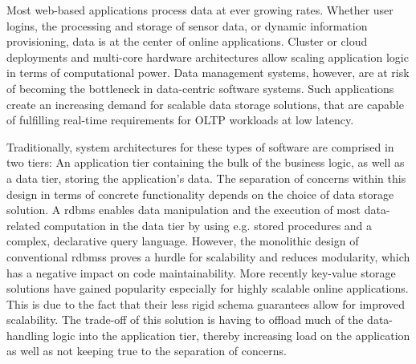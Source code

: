 
  Most web-based applications process data at ever growing rates.
  Whether user logins, the processing and storage of sensor data, or dynamic information provisioning, data is at the center of online applications.
  Cluster or cloud deployments and multi-core hardware architectures allow scaling application logic in terms of computational power.
  Data management systems, however, are at risk of becoming the bottleneck in data-centric software systems.
  Such applications create an increasing demand for scalable data storage solutions, that are capable of fulfilling real-time requirements for OLTP workloads at low latency. %

  Traditionally, system architectures for these types of software are comprised in two tiers:
  An application tier containing the bulk of the business logic, as well as a data tier, storing the application's data.
  The separation of concerns within this design in terms of concrete functionality depends on the choice of data storage solution.
  A \gls{rdbms} enables data manipulation and the execution of most data-related computation in the data tier by using e.g. stored procedures and a complex, declarative query language.
  However, the monolithic design of conventional \glspl{rdbms} proves a hurdle for scalability and reduces modularity, which has a negative impact on code maintainability. %
  More recently key-value storage solutions have gained popularity especially for highly scalable online applications.
  This is due to the fact that their less rigid schema guarantees allow for improved scalability. %
  The trade-off of this solution is having to offload much of the data-handling logic into the application tier, thereby increasing load on the application as well as not keeping true to the separation of concerns.

